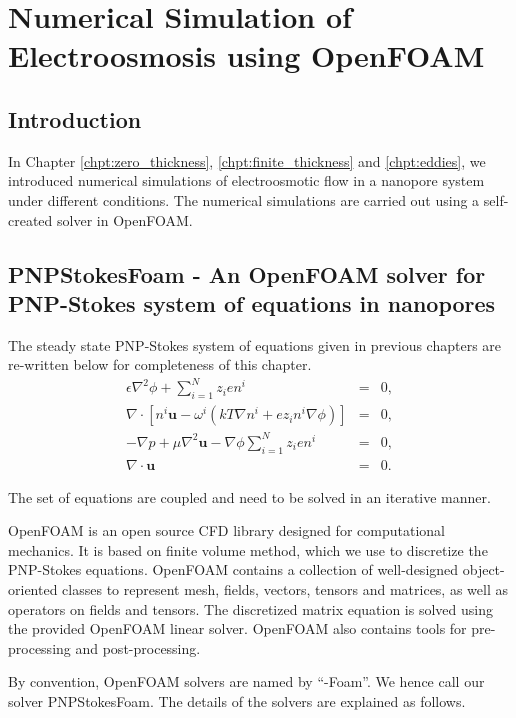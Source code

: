 \chapter{Numerical Simulation of Electroosmosis using OpenFOAM}
\label{chpt:numerical}
\section{Introduction}
In Chapter \ref{chpt:zero_thickness}, \ref{chpt:finite_thickness} and \ref{chpt:eddies}, we introduced numerical simulations of electroosmotic flow in a nanopore system under different conditions. The numerical simulations are carried out using a self-created solver in OpenFOAM. 

\section{PNPStokesFoam - An OpenFOAM solver for PNP-Stokes system of equations in nanopores}
The steady state PNP-Stokes system of equations given in previous chapters are re-written below for completeness of this chapter. 
\begin{eqnarray}
\epsilon \nabla^2 \phi + \sum_{i=1}^{N} z_ien^i & = & 0,
\label{eq:poisson_num}
\\
\nabla\cdot\left\lbrack n^i\mathbf{u} -\omega^i(kT\nabla
n^i + ez_in^i\nabla\phi) \right\rbrack&=&0 ,
\label{eq:NP_num}
\\ 
-\nabla p + \mu \nabla^2 \mathbf{u} -  \nabla \phi \sum_{i=1}^{N} z_ien^i & = & 0, \label{eq:stokes_num}\\
\nabla \cdot \mathbf{u} & = & 0. \label{eq:continuity_num}
\end{eqnarray} 

The set of equations are coupled and need to be solved in an iterative manner. 

OpenFOAM is an open source CFD library \cite{OPENFOAM} designed for computational mechanics. It is based on finite volume method, which we use to discretize the PNP-Stokes equations. OpenFOAM contains a collection of well-designed object-oriented classes to represent mesh, fields, vectors, tensors and matrices, as well as operators on fields and tensors. The discretized matrix equation is solved using the provided OpenFOAM linear solver. OpenFOAM also contains tools for pre-processing and post-processing.

By convention, OpenFOAM solvers are named by ``-Foam''. We hence call our solver PNPStokesFoam. The details of the solvers are explained as follows.

